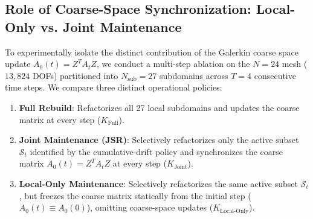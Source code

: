 \documentclass[preprint,12pt,3p]{elsarticle}
\begin{document}
\subsection{Role of Coarse-Space Synchronization: Local-Only vs. Joint Maintenance}
\label{subsec:res_coarse_ablation}

To experimentally isolate the distinct contribution of the Galerkin coarse space update $A_0(t) = Z^T A_t Z$, we conduct a multi-step ablation on the $N=24$ mesh ($13,824$ DOFs) partitioned into $N_{\text{sub}} = 27$ subdomains across $T=4$ consecutive time steps. We compare three distinct operational policies:
\begin{enumerate}
    \item \textbf{Full Rebuild}: Refactorizes all 27 local subdomains and updates the coarse matrix at every step ($K_{\text{Full}}$).
    \item \textbf{Joint Maintenance (JSR)}: Selectively refactorizes only the active subset $\mathcal{S}_t$ identified by the cumulative-drift policy and synchronizes the coarse matrix $A_0(t) = Z^T A_t Z$ at every step ($K_{\text{Joint}}$).
    \item \textbf{Local-Only Maintenance}: Selectively refactorizes the same active subset $\mathcal{S}_t$, but freezes the coarse matrix statically from the initial step ($A_0(t) \equiv A_0(0)$), omitting coarse-space updates ($K_{\text{Local-Only}}$).
\end{enumerate}

\begin{table}[htbp]
\centering
\small
\caption{Historical benchmark: Multi-step comparison between Full Rebuild, Joint JSR, and Local-Only maintenance ($N=24$, 27 subdomains, 4 time steps).}
\label{tab:coarse_ablation}
\end{table}
\end{document}
